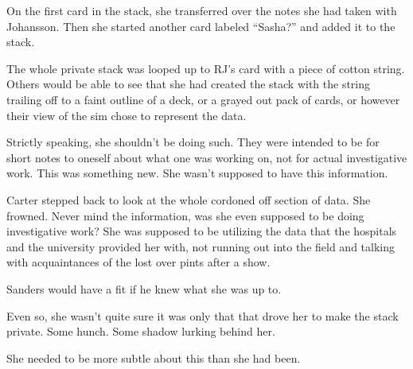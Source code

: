 On the first card in the stack, she transferred over the notes she had taken with Johansson. Then she started another card labeled ``Sasha?'' and added it to the stack.

The whole private stack was looped up to RJ's card with a piece of cotton string. Others would be able to see that she had created the stack with the string trailing off to a faint outline of a deck, or a grayed out pack of cards, or however their view of the sim chose to represent the data.

Strictly speaking, she shouldn't be doing such. They were intended to be for short notes to oneself about what one was working on, not for actual investigative work. This was something new. She wasn't supposed to have this information.

Carter stepped back to look at the whole cordoned off section of data. She frowned. Never mind the information, was she even supposed to be doing investigative work? She was supposed to be utilizing the data that the hospitals and the university provided her with, not running out into the field and talking with acquaintances of the lost over pints after a show.

Sanders would have a fit if he knew what she was up to.

Even so, she wasn't quite sure it was only that that drove her to make the stack private. Some hunch. Some shadow lurking behind her.

She needed to be more subtle about this than she had been.
